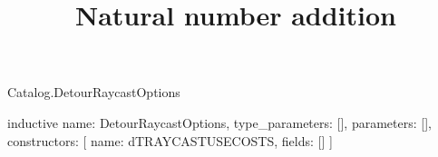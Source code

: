\begin{lexlean}{Catalog.DetourRaycastOptions}
\title{Natural number addition}
\begin{semanticmodule}
inductive{
  name: DetourRaycastOptions,
  type_parameters: [],
  parameters: [],
  constructors: [
    {name: dTRAYCASTUSECOSTS, fields: []}
  ]
}
\end{semanticmodule}
\end{lexlean}

